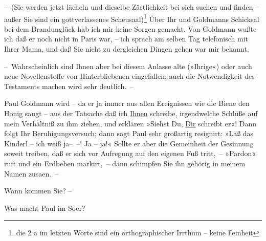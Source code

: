                – (Sie werden jetzt lächeln und dieselbe Zärtlichkeit bei sich suchen und finden –
               außer Sie sind ein gottverlassenes {\pb}Scheusaal)\footnote{\noindent{}die 2 a im letzten Worte sind ein orthographischer Irrthum – keine Feinheit} Über Ihr und Goldmanns Schicksal  bei dem
               Brandunglück hab ich mir keine Sorgen gemacht. Von Goldmann wußte ich daß er noch nicht in Paris war, – ich sprach am selben {\pb}Tag telefonisch mit Ihrer Mama, und daß Sie nicht zu
               dergleichen Dingen gehen war mir bekannt.\pend
           
\pstart
           – Wahrscheinlich sind Ihnen aber bei diesem Anlasse alte (»Ihrige«) oder auch neue
               Novellenstoffe von Hinterbliebenen eingefallen; auch {\pb}die Notwendigkeit des Testaments
               machen wird sehr deutlich. –\pend
           
\pstart
           Paul Goldmann wird – da er ja immer aus allen
               Ereignissen wie die Biene den Honig saugt – aus der Tatsache daß ich \uline{Ihnen} schreibe, irgendwelche Schlüße auf mein Verhältniß zu
               ihm ziehen, und erklären {\pb}»Siehst
               Du, \uline{Dir} schreibt er«! Dann folgt Ihr
               Beruhigungsversuch; dann sagt Paul sehr
               großartig resignirt: »Laß das Kinderl – ich weiß ja– –! Ja – ja!« Sollte er aber die
               Gemeinheit der Gesinnung soweit treiben, daß er sich vor Aufregung {\pb}auf den eigenen Fuß tritt, –
               »Pardon« ruft und ein Erdbeben markirt, – dann schimpfen Sie ihn gehörig in meinem
               Namen zusa{\geminationm}en. –\pend
           
\pstart
           Wann kommen Sie? –\pend
           
\pstart
           Was macht Paul im So{\geminationm}er?\pend
           
